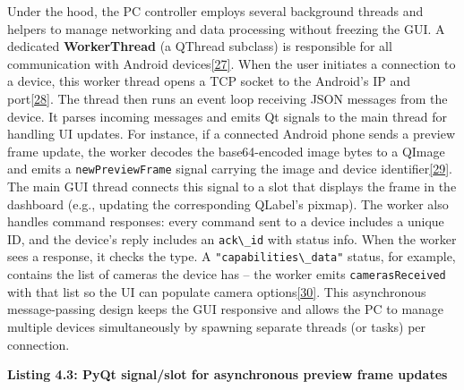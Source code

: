 \documentclass[12pt,a4paper]{article}
\begin{document}
Under the hood, the PC controller employs several background threads and helpers to manage networking and data processing without freezing the GUI. A dedicated \textbf{WorkerThread} (a QThread subclass) is responsible for all communication with Android devices\href{https://github.com/buccancs/GSR-Dual-Video-System/blob/05ae360cb7b4ae7c7861f72deb235ad64a74b38e/pc_controller/src/main/main.py\#L32-L40}{{[}27{]}}. When the user initiates a connection to a device, this worker thread opens a TCP socket to the Android's IP and port\href{https://github.com/buccancs/GSR-Dual-Video-System/blob/05ae360cb7b4ae7c7861f72deb235ad64a74b38e/pc_controller/src/main/main.py\#L53-L61}{{[}28{]}}. The thread then runs an event loop receiving JSON messages from the device. It parses incoming messages and emits Qt signals to the main thread for handling UI updates. For instance, if a connected Android phone sends a preview frame update, the worker decodes the base64-encoded image bytes to a QImage and emits a \passthrough{\lstinline!newPreviewFrame!} signal carrying the image and device identifier\href{https://github.com/buccancs/GSR-Dual-Video-System/blob/05ae360cb7b4ae7c7861f72deb235ad64a74b38e/pc_controller/src/main/main.py\#L64-L72}{{[}29{]}}. The main GUI thread connects this signal to a slot that displays the frame in the dashboard (e.g., updating the corresponding QLabel's pixmap). The worker also handles command responses: every command sent to a device includes a unique ID, and the device's reply includes an \passthrough{\lstinline!ack\_id!} with status info. When the worker sees a response, it checks the type. A \passthrough{\lstinline!"capabilities\_data"!} status, for example, contains the list of cameras the device has -- the worker emits \passthrough{\lstinline!camerasReceived!} with that list so the UI can populate camera options\href{https://github.com/buccancs/GSR-Dual-Video-System/blob/05ae360cb7b4ae7c7861f72deb235ad64a74b38e/pc_controller/src/main/main.py\#L74-L81}{{[}30{]}}. This asynchronous message-passing design keeps the GUI responsive and allows the PC to manage multiple devices simultaneously by spawning separate threads (or tasks) per connection.

\textbf{Listing 4.3: PyQt signal/slot for asynchronous preview frame updates}
\end{document}
